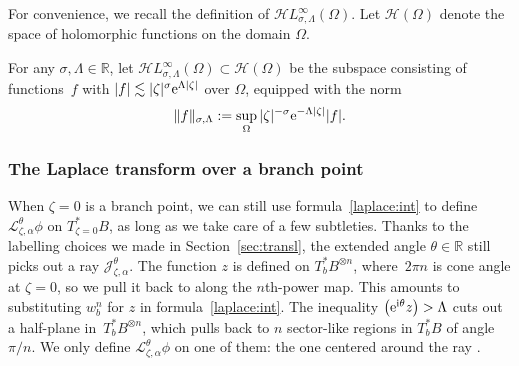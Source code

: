 \documentclass[10pt,a4paper]{amsart}
\let\Re\relax
\DeclareMathOperator{\Re}{Re}
\newcommand{\holo}{\mathcal{H}}
\newcommand{\singexp}[2]{\mathcal{H}L^\infty_{#1, #2}}
\newcommand{\R}{\mathbb{R}}
\newcommand{\laplace}{\mathcal{L}}
\numberwithin{equation}{section}
\begin{document}
For convenience, we recall the definition of $\singexp{\sigma}{\Lambda}(\Omega)$. Let $\holo(\Omega)$ denote the space of holomorphic functions on the domain $\Omega$.
\begin{Definition}\label{def:HL_inf}
For any $\sigma, \Lambda \in \R$, let
$\singexp{\sigma}{\Lambda}(\Omega) \subset \holo(\Omega) $
be the subspace consisting of functions~$f$ with $|f| \lesssim |\zeta|^\sigma {\rm e}^{\Lambda|\zeta|}$ over $\Omega$, equipped with the norm
\[ \|f\|_{\sigma,\Lambda} := \sup_\Omega |\zeta|^{-\sigma} {\rm e}^{-\Lambda|\zeta|} |f|. \]
\end{Definition}
\subsubsection{The Laplace transform over a branch point}
When $\zeta = 0$ is a branch point, we can still use formula~\eqref{laplace:int} to define $\laplace_{\zeta, \alpha}^\theta \phi$ on $T_{\zeta = 0}^*B$, as long as we take care of a few subtleties. Thanks to the labelling choices we made in Section~\ref{sec:transl}, the extended angle $\theta \in \R$ still picks out a ray $\mathcal{J}_{\zeta, \alpha}^\theta$. The function $z$ is defined on $T_b^*B^{\otimes n}$, where~$2\pi n$ is cone angle at $\zeta = 0$, so we pull it back to  along the $n$th-power map. This amounts to substituting $w_b^n$ for $z$ in formula~\eqref{laplace:int}. The inequality $\Re\bigl({\rm e}^{{\rm i}\theta} z\bigr) > \Lambda$ cuts out a half-plane in~$T_b^*B^{\otimes n}$, which pulls back to $n$ sector-like regions in $T_b^*B$ of angle $\pi/n$. We only define $\laplace_{\zeta, \alpha}^\theta \phi$ on one of them: the one centered around the ray \smash{$w_b \in {\rm e}^{-{\rm i}\theta/n}[0, \infty)$}.
\end{document}

